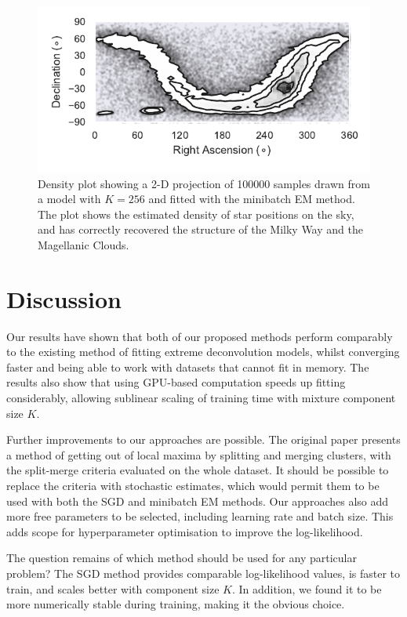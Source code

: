 \documentclass{article}
\begin{document}
\begin{figure}
  \centering
  \includegraphics{figures/density.pdf}
  \caption{Density plot showing a 2-D projection of 100000 samples drawn from a model with $K=256$ and fitted with the minibatch EM method.
  The plot shows the estimated density of star positions on the sky, and has correctly recovered the structure of the Milky Way and the Magellanic Clouds.}
  \label{fig:projection}
\end{figure}

\section{Discussion}

Our results have shown that both of our proposed methods perform comparably to the existing method of fitting extreme deconvolution models, whilst converging faster and being able to work with datasets that cannot fit in memory.
The results also show that using GPU-based computation speeds up fitting considerably, allowing sublinear scaling of training time with mixture component size $K$.

Further improvements to our approaches are possible.
The original paper presents a method of getting out of local maxima by splitting and merging clusters, with the split-merge criteria evaluated on the whole dataset.
It should be possible to replace the criteria with stochastic estimates, which would permit them to be used with both the SGD and minibatch EM methods.
Our approaches also add more free parameters to be selected, including learning rate and batch size.
This adds scope for hyperparameter optimisation to improve the log-likelihood.

The question remains of which method should be used for any particular problem?
The SGD method provides comparable log-likelihood values, is faster to train, and scales better with component size $K$.
In addition, we found it to be more numerically stable during training, making it the obvious choice.
\end{document}
